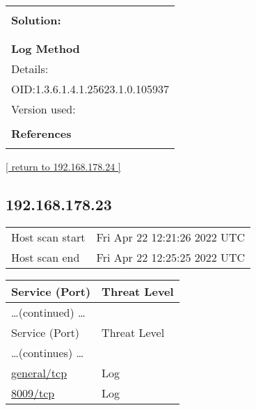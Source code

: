 \documentclass{article}
\begin{document}
\begin{longtable}{|p{}|}
          \hline
          \\
\textbf{Solution:}\\
\\


        \hline
        \\
\textbf{Log Method}\\
Details:
\rowcolor{white}{\verb=OS Detection Consolidation and Reporting=}\\
OID:1.3.6.1.4.1.25623.1.0.105937\\
Version used:
\rowcolor{white}{\verb=2022-04-05T09:27:51Z=}\\

      \hline
      \\
\textbf{References}\\
\rowcolor{white}{\verb=url: https://community.greenbone.net/c/vulnerability-tests=}\\
\end{longtable}

\begin{footnotesize}\hyperref[host:192.168.178.24]{[ return to 192.168.178.24 ]}\end{footnotesize}
\subsection{192.168.178.23}
\label{host:192.168.178.23}

\begin{tabular}{ll}
Host scan start&Fri Apr 22 12:21:26 2022 UTC\\
Host scan end&Fri Apr 22 12:25:25 2022 UTC\\
\end{tabular}

\begin{longtable}{|l|l|}
\hline
\rowcolor{gvm_report}Service (Port)&Threat Level\\
\hline
\endfirsthead
\multicolumn{2}{l}{\hfill\ldots (continued) \ldots}\\
\hline
\rowcolor{gvm_report}Service (Port)&Threat Level\\
\hline
\endhead
\hline
\multicolumn{2}{l}{\ldots (continues) \ldots}\\
\endfoot
\hline
\endlastfoot
\hline
\hyperref[port:192.168.178.23 general/tcp Log]{general/tcp}&Log\\
\hline
\hyperref[port:192.168.178.23 8009/tcp Log]{8009/tcp}&Log\\
\hline
\end{longtable}
\end{document}
